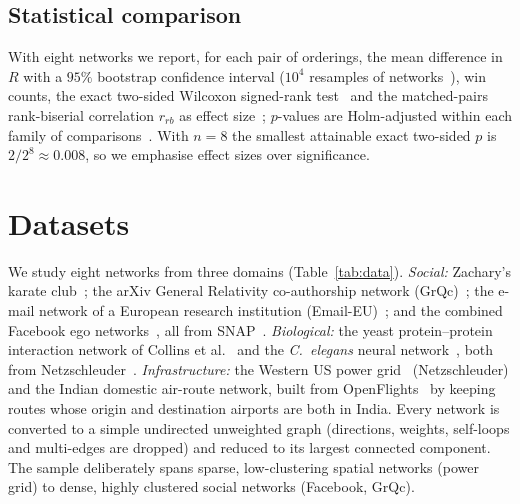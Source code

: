 \documentclass[conference]{IEEEtran}
\newcommand{\coh}{\kappa}
\begin{document}
\subsection{Statistical comparison}
With eight networks we report, for each pair of orderings, the mean difference in $R$ with a $95\%$
bootstrap confidence interval ($10^4$ resamples of networks~\cite{efron1979bootstrap}), win counts, the
exact two-sided Wilcoxon signed-rank test~\cite{wilcoxon1945individual} and the matched-pairs
rank-biserial correlation $r_{rb}$ as effect size~\cite{kerby2014simple}; $p$-values are Holm-adjusted
within each family of comparisons~\cite{holm1979simple}. With $n=8$ the smallest attainable exact
two-sided $p$ is $2/2^8\approx0.008$, so we emphasise effect sizes over significance.

\section{Datasets}
\label{sec:data}
We study eight networks from three domains (Table~\ref{tab:data}). \emph{Social:} Zachary's karate
club~\cite{zachary1977information}; the arXiv General Relativity co-authorship network
(GrQc)~\cite{leskovec2007graph}; the e-mail network of a European research institution
(Email-EU)~\cite{yin2017local,leskovec2007graph}; and the combined Facebook ego
networks~\cite{mcauley2012learning}, all from SNAP~\cite{snapnets}. \emph{Biological:} the yeast
protein--protein interaction network of Collins et al.~\cite{collins2007toward} and the
\emph{C.~elegans} neural network~\cite{white1986structure,watts1998collective}, both from
Netzschleuder~\cite{peixoto2020netzschleuder}. \emph{Infrastructure:} the Western US power
grid~\cite{watts1998collective} (Netzschleuder) and the Indian domestic air-route network, built from
OpenFlights~\cite{openflights} by keeping routes whose origin and destination airports are both in India.
Every network is converted to a simple undirected unweighted graph (directions, weights, self-loops and
multi-edges are dropped) and reduced to its largest connected component. The sample deliberately spans
sparse, low-clustering spatial networks (power grid) to dense, highly clustered social networks
(Facebook, GrQc).

\begin{table}[t]
\centering
\caption{Network statistics after preprocessing (largest connected component). $C$: average
clustering; $r$: degree assortativity; $k_{\max}$: degeneracy; $\coh_{\max}$: maximum cohesion level.}
\label{tab:data}

\end{table}
\end{document}
